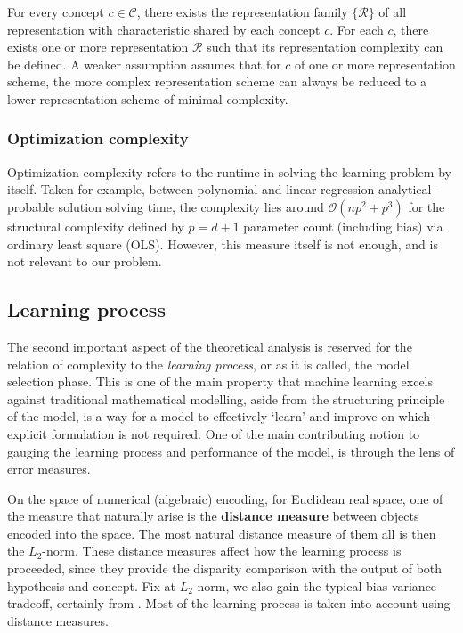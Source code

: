 \documentclass{article}
\begin{document}
\begin{assumption}
    For every concept $c\in\mathcal{C}$, there exists the representation family $\{\mathcal{R}\}$ of all representation with characteristic shared by each concept $c$. For each $c$, there exists one or more representation $\mathcal{R}$ such that its representation complexity can be defined. A weaker assumption assumes that for $c$ of one or more representation scheme, the more complex representation scheme can always be reduced to a lower representation scheme of minimal complexity.
\end{assumption}



\subsubsection{Optimization complexity}

Optimization complexity refers to the runtime in solving the learning problem by itself. Taken for example, between polynomial and linear regression analytical-probable solution solving time, the complexity lies around $\mathcal{O}(np^{2}+p^{3})$ for the structural complexity defined by $p=d+1$ parameter count (including bias) via ordinary least square (OLS). However, this measure itself is not enough, and is not relevant to our problem. 


\subsection{Learning process}
The second important aspect of the theoretical analysis is reserved for the relation of complexity to the \textit{learning process}, or as it is called, the model selection phase. This is one of the main property that machine learning excels against traditional mathematical modelling, aside from the structuring principle of the model, is a way for a model to effectively `learn' and improve on which explicit formulation is not required. One of the main contributing notion to gauging the learning process and performance of the model, is through the lens of error measures. 

On the space of numerical (algebraic) encoding, for Euclidean real space, one of the measure that naturally arise is the \textbf{distance measure} between objects encoded into the space. The most natural distance measure of them all is then the $L_{2}$-norm. These distance measures affect how the learning process is proceeded, since they provide the disparity comparison with the output of both hypothesis and concept. Fix at $L_{2}$-norm, we also gain the typical bias-variance tradeoff, certainly from \cite{6797087}. Most of the learning process is taken into account using distance measures. 
\end{document}
